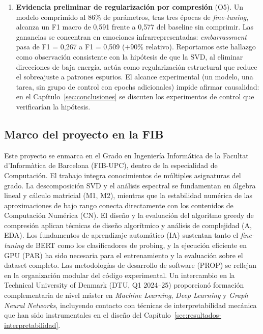 \begin{enumerate}[label=\textbf{C\arabic*.}]
    \item \textbf{Evidencia preliminar de regularización por compresión}
    (O5). Un modelo comprimido al 86\% de parámetros, tras tres épocas de
    \emph{fine-tuning}, alcanza un F1 macro de 0{,}591 frente a 0{,}577 del baseline
    sin comprimir. Las ganancias se concentran en emociones
    infrarrepresentadas: \emph{embarrassment} pasa de F1 = 0{,}267 a F1 =
    0{,}509 ($+90\%$ relativo). Reportamos este hallazgo como observación
    consistente con la hipótesis de que la SVD, al eliminar direcciones de
    baja energía, actúa como regularización estructural que reduce el
    sobreajuste a patrones espurios. El alcance experimental (un modelo, una
    tarea, sin grupo de control con epochs adicionales) impide afirmar
    causalidad: en el Capítulo~\ref{sec:conclusiones} se discuten los
    experimentos de control que verificarían la hipótesis.

\end{enumerate}


\subsection{Marco del proyecto en la FIB}
\label{sec:marco-fib}

Este proyecto se enmarca en el Grado en Ingeniería Informática de la Facultat
d'Informàtica de Barcelona (FIB-UPC), dentro de la especialidad de Computación.
El trabajo integra conocimientos de múltiples asignaturas del grado. La
descomposición SVD y el análisis espectral se fundamentan en álgebra lineal y
cálculo matricial (M1, M2), mientras que la estabilidad numérica de las
aproximaciones de bajo rango conecta directamente con los contenidos de
Computación Numérica (CN). El diseño y la evaluación del algoritmo greedy de
compresión aplican técnicas de diseño algorítmico y análisis de complejidad (A,
EDA). Los fundamentos de aprendizaje automático (IA) sustentan tanto el
\emph{fine-tuning} de BERT como los clasificadores de probing, y la ejecución
eficiente en GPU (PAR) ha sido necesaria para el entrenamiento y la evaluación
sobre el dataset completo. Las metodologías de desarrollo de software (PROP)
se reflejan en la organización modular del código experimental. Un intercambio
en la Technical University of Denmark (DTU, Q1 2024--25) proporcionó formación
complementaria de nivel máster en \textit{Machine Learning}, \textit{Deep
Learning} y \textit{Graph Neural Networks}, incluyendo contacto con técnicas de
interpretabilidad mecánica que han sido instrumentales en el diseño del
Capítulo~\ref{sec:resultados-interpretabilidad}.

